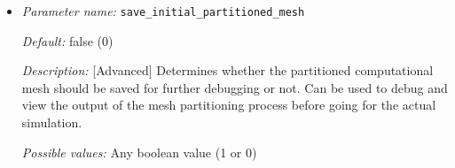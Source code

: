 \begin{itemize}

{\it Default:} false (0)

{\it Description:} [Advanced] Determines whether the initial computational mesh should be saved for further debugging or not. Can be used to investigate the mesh refinement if it is asked by setting {\tt refine\_initial\_mesh} to true.

{\it Possible values:} Any boolean value (1 or 0)


\item {\it Parameter name:} {\tt save\_initial\_partitioned\_mesh}
\label{parameters:save_initial_partitioned_mesh}


{\it Default:} false (0)

{\it Description:} [Advanced] Determines whether the partitioned computational mesh should be saved for further debugging or not. Can be used to debug and view the output of the mesh partitioning process before going for the actual simulation.

{\it Possible values:} Any boolean value (1 or 0)


\end{itemize}
